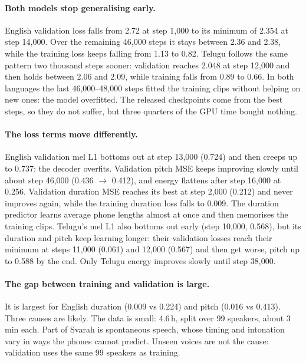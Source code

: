 \documentclass[11pt,a4paper]{article}
\begin{document}
\paragraph{Both models stop generalising early.} English validation loss falls from 2.72 at step 1,000 to its
minimum of 2.354 at step 14,000. Over the remaining 46,000 steps it stays between 2.36 and 2.38, while the training
loss keeps falling from 1.13 to 0.82. Telugu follows the same pattern two thousand steps sooner: validation reaches
2.048 at step 12,000 and then holds between 2.06 and 2.09, while training falls from 0.89 to 0.66. In both languages
the last 46,000--48,000 steps fitted the training clips without helping on new ones: the model overfitted. The released checkpoints come
from the best steps, so they do not suffer, but three quarters of the GPU time bought nothing.

\paragraph{The loss terms move differently.} English validation mel L1 bottoms out at step 13,000 (0.724) and then
creeps up to 0.737: the decoder overfits. Validation pitch MSE keeps improving slowly until about step 46,000
(0.436 $\rightarrow$ 0.412), and energy flattens after step 16,000 at 0.256. Validation duration MSE reaches its
best at step 2,000 (0.212) and never improves again, while the training duration loss falls to 0.009. The duration
predictor learns average phone lengths almost at once and then memorises the training clips. Telugu's mel L1 also
bottoms out early (step 10,000, 0.568), but its duration and pitch keep learning longer: their validation losses
reach their minimum at steps 11,000 (0.061) and 12,000 (0.567) and then get worse, pitch up to 0.588 by the end.
Only Telugu energy improves slowly until step 38,000.

\paragraph{The gap between training and validation is large.} It is largest for English duration (0.009 vs
0.224) and pitch (0.016 vs 0.413). Three causes are likely. The data is small: 4.6\,h, split over 99 speakers, about
3\,min each. Part of Svarah is spontaneous speech, whose timing and intonation vary in ways the phones cannot
predict. Unseen voices are not the cause: validation uses the same 99 speakers as training.
\end{document}
